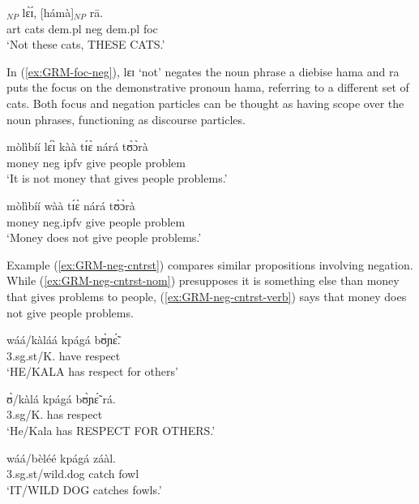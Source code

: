 \begin{exe}
\begin{exe}
\begin{exe}
{\begin{exe}
\begin{exe}
\begin{exe}
\begin{exe}
\begin{exe}
\begin{exe}
\begin{exe}
\begin{exe}
\begin{exe}
\begin{exe}
\begin{exe}
\begin{exe}
 \gll [à dìèbísè hámà]$_{NP}$ lɛ̀ɪ́, [hámà]$_{NP}$ rā.\\
  {\sc art} cats {\sc dem.pl} {\sc neg}  {\sc dem.pl} {\sc foc}\\
 \glt   `Not these cats, THESE CATS.'
\z

In  (\ref{ex:GRM-foc-neg}), {\sls lɛɪ} `not' negates the noun phrase {\sls a 
diebise
hama} and {\sls ra} puts the focus on the demonstrative pronoun {\sls hama},
referring to a different set of cats.  Both focus and negation particles can be
thought as having scope over the noun phrases, functioning as discourse 
particles. 


\ea\label{ex:GRM-neg-cntrst}
  \ea\label{ex:GRM-neg-cntrst-nom}

 \gll  mòlìbíí lɛ́ɪ̀  kàà tɪ́ɛ̀ nárá tʊ̀ɔ̀rà\\
 money {\sc neg} {\sc ipfv} give people problem\\
 \glt  `It is not money that gives people problems.'

 
  \ex\label{ex:GRM-neg-cntrst-verb}
 \gll   mòlìbíí wàà tɪ́ɛ̀ nárá tʊ̀ɔ̀rà \\
 money {\sc neg.ipfv} give people problem\\
 \glt  `Money does not give people problems.'

\z
\z

Example ({\ref{ex:GRM-neg-cntrst}}) compares similar propositions involving negation. While 
({\ref{ex:GRM-neg-cntrst-nom}}) presupposes   it is something else than money  that gives  problems 
to people,  ({\ref{ex:GRM-neg-cntrst-verb}}) says that money does not give people problems.




\ea\label{ex:GRM-foc-lenght}
  \ea\label{ex:GRM-foc-w-lenght}
 \gll wáá/kàláá kpágá bʊ̀ɲɛ̃́.\\
 {\sc 3.sg.st}/K.{\foc}  have respect\\
 \glt  `HE/KALA has respect for others'

   \ex\label{ex:GRM-foc-n-lenght} 
 \gll ʊ̀/kàlá kpágá bʊ̀ɲɛ̃́ rá.\\
{\sc 3.sg}/K.  has respect {\foc}\\
\glt `He/Kala has RESPECT FOR OTHERS.' 

 \ex\label{ex:GRM-foc-w-lenght-2} 
\gll  wáá/bèléé kpágá záàl.\\
 {\sc 3.sg.st}/wild.dog{\foc}    catch fowl\\
 \glt   `IT/WILD DOG catches fowls.'


\end{exe}
\end{exe}
\end{exe}
\end{exe}
\end{exe}
\end{exe}
\end{exe}
\end{exe}
\end{exe}
\end{exe}
\end{exe}
\end{exe}}
\end{exe}
\end{exe}
\end{exe}
